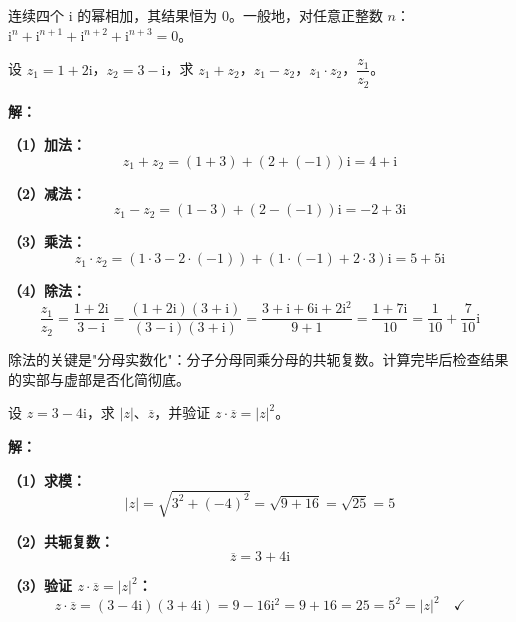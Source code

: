 \documentclass[12pt, a4paper]{ctexart}
\begin{document}
\begin{tipbox}[方法总结]
连续四个 $\mathrm{i}$ 的幂相加，其结果恒为 $0$。一般地，对任意正整数 $n$：
$\mathrm{i}^n + \mathrm{i}^{n+1} + \mathrm{i}^{n+2} + \mathrm{i}^{n+3} = 0$。
\end{tipbox}

\vspace{6pt}

\begin{examplebox}[【例题4】复数的四则运算]
设 $z_1 = 1 + 2\mathrm{i}$，$z_2 = 3 - \mathrm{i}$，求 $z_1 + z_2$，$z_1 - z_2$，$z_1 \cdot z_2$，$\dfrac{z_1}{z_2}$。
\end{examplebox}

\textbf{解：}

\textbf{（1）加法：}
\[
  z_1 + z_2 = (1 + 3) + (2 + (-1))\mathrm{i} = 4 + \mathrm{i}
\]

\textbf{（2）减法：}
\[
  z_1 - z_2 = (1 - 3) + (2 - (-1))\mathrm{i} = -2 + 3\mathrm{i}
\]

\textbf{（3）乘法：}
\[
  z_1 \cdot z_2 = (1 \cdot 3 - 2 \cdot (-1)) + (1 \cdot (-1) + 2 \cdot 3)\mathrm{i} = 5 + 5\mathrm{i}
\]

\textbf{（4）除法：}
\[
  \frac{z_1}{z_2} = \frac{1 + 2\mathrm{i}}{3 - \mathrm{i}}
  = \frac{(1 + 2\mathrm{i})(3 + \mathrm{i})}{(3 - \mathrm{i})(3 + \mathrm{i})}
  = \frac{3 + \mathrm{i} + 6\mathrm{i} + 2\mathrm{i}^2}{9 + 1}
  = \frac{1 + 7\mathrm{i}}{10}
  = \frac{1}{10} + \frac{7}{10}\mathrm{i}
\]

\begin{tipbox}[方法总结]
除法的关键是"分母实数化"：分子分母同乘分母的共轭复数。计算完毕后检查结果的实部与虚部是否化简彻底。
\end{tipbox}

\vspace{6pt}

\begin{examplebox}[【例题5】复数的模与共轭复数]
设 $z = 3 - 4\mathrm{i}$，求 $|z|$、$\overline{z}$，并验证 $z \cdot \overline{z} = |z|^2$。
\end{examplebox}

\textbf{解：}

\textbf{（1）求模：}
\[
  |z| = \sqrt{3^2 + (-4)^2} = \sqrt{9 + 16} = \sqrt{25} = 5
\]

\textbf{（2）共轭复数：}
\[
  \overline{z} = 3 + 4\mathrm{i}
\]

\textbf{（3）验证 $z \cdot \overline{z} = |z|^2$：}
\[
  z \cdot \overline{z} = (3 - 4\mathrm{i})(3 + 4\mathrm{i}) = 9 - 16\mathrm{i}^2 = 9 + 16 = 25 = 5^2 = |z|^2 \quad\checkmark
\]
\end{document}
